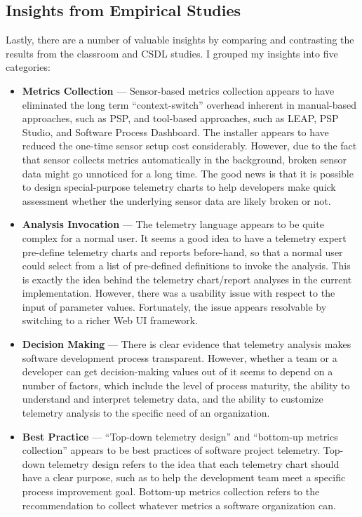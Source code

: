 \subsection{Insights from Empirical Studies} \label{Conclusion:Contribution:insights}

Lastly, there are a number of valuable insights by comparing and contrasting the results from the classroom and CSDL studies. I grouped my insights into five categories:

\begin{itemize}
	\item \textbf{Metrics Collection} --- Sensor-based metrics collection appears to have eliminated the long term ``context-switch'' overhead inherent in manual-based approaches, such as PSP, and tool-based approaches, such as LEAP, PSP Studio, and Software Process Dashboard. The installer appears to have reduced the one-time sensor setup cost considerably. However, due to the fact that sensor collects metrics automatically in the background, broken sensor data might go unnoticed for a long time. The good news is that it is possible to design special-purpose telemetry charts to help developers make quick assessment whether the underlying sensor data are likely broken or not.
	
	\item \textbf{Analysis Invocation} --- The telemetry language appears to be quite complex for a normal user. It seems a good idea to have a telemetry expert pre-define telemetry charts and reports before-hand, so that a normal user could select from a list of pre-defined definitions to invoke the analysis. This is exactly the idea behind the telemetry chart/report analyses in the current implementation. However, there was a usability issue with respect to the input of parameter values. Fortunately, the issue appears resolvable by switching to a richer Web UI framework.
	
	\item \textbf{Decision Making} --- There is clear evidence that telemetry analysis makes software development process transparent. However, whether a team or a developer can get decision-making values out of it seems to depend on a number of factors, which include the level of process maturity, the ability to understand and interpret telemetry data, and the ability to customize telemetry analysis to the specific need of an organization.
	
	\item \textbf{Best Practice} ---  ``Top-down telemetry design'' and ``bottom-up metrics collection'' appears to be best practices of software project telemetry. Top-down telemetry design refers to the idea that each telemetry chart should have a clear purpose, such as to help the development team meet a specific process improvement goal. Bottom-up metrics collection refers to the recommendation to collect whatever metrics a software organization can.
	

\end{itemize}
